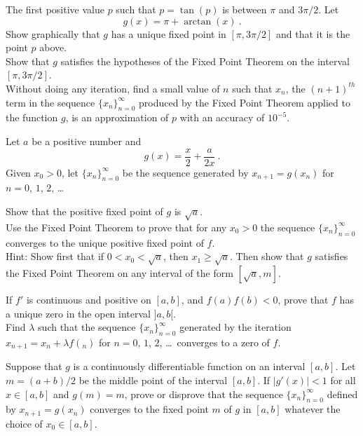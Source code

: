 \begin{question}
The first positive value $p$ such that $p=\tan(p)$ is between $\pi$
and $3\pi/2$.  Let
\[
g(x) = \pi + \arctan(x) \ .
\]
 Show graphically that $g$ has a unique fixed point in
$[\pi,3\pi/2]$ and that it is the point $p$ above.\\
 Show that $g$ satisfies the hypotheses of the Fixed Point
Theorem on the interval $[\pi,3\pi/2]$.\\
 Without doing any iteration, find a small value
of $n$ such that $x_n$, the $(n+1)^{th}$ term in the sequence
$\{x_n\}_{n=0}^\infty$ produced by the Fixed Point Theorem applied to
the function $g$, is an approximation of $p$ with an accuracy of
$10^{-5}$.
\label{solvAQ22}
\end{question}

\begin{question}
Let $a$ be a positive number and
\begin{equation}\label{classicAnal}
g(x) = \frac{x}{2} + \frac{a}{2x} \ .
\end{equation}
Given $x_0>0$, let $\displaystyle \{x_n\}_{n=0}^{\infty}$ be the
sequence generated by $x_{n+1} = g(x_n)$ for $n=0$, $1$, $2$, \ldots

 Show that the positive fixed point of $g$ is $\sqrt{a}$.\\
 Use the Fixed Point Theorem to prove that for any $x_0 > 0$
the sequence $\displaystyle \{x_n\}_{n=0}^{\infty}$ converges to the
unique positive fixed point of $f$.\\
Hint: Show first that if $0<x_0<\sqrt{a}$, then $x_1 \geq \sqrt{a}$.
Then show that $g$ satisfies the Fixed Point Theorem on any interval
of the form $[\sqrt{a},m]$.
\label{solvAQ23}
\end{question}

\begin{question}
 If $f'$ is continuous and positive on $[a,b]$, and
$f(a)f(b)<0$, prove that $f$ has a unique zero in the open interval
$]a,b[$.\\
 Find $\lambda$ such that the sequence
$\displaystyle \{x_n\}_{n=0}^\infty$ generated by the iteration
$x_{n+1} = x_n +\lambda f(_n)$ for $n=0$, $1$, $2$, \ldots\ converges
to a zero of $f$.
\label{solvAQ24}
\end{question}

\begin{question}
Suppose that $g$ is a continuously differentiable function on an
interval $[a,b]$.  Let $m=(a+b)/2$ be the middle point of the interval
$[a,b]$.  If $|g'(x)| < 1$ for all $x\in [a,b]$ and
$g(m)=m$, prove or disprove that the sequence $\{x_n\}_{n=0}^\infty$
defined by $x_{n+1} = g(x_n)$ converges to the fixed point $m$ of $g$ in
$[a,b]$ whatever the choice of $x_0 \in[a,b]$.
\label{solvAQ25}
\end{question}

